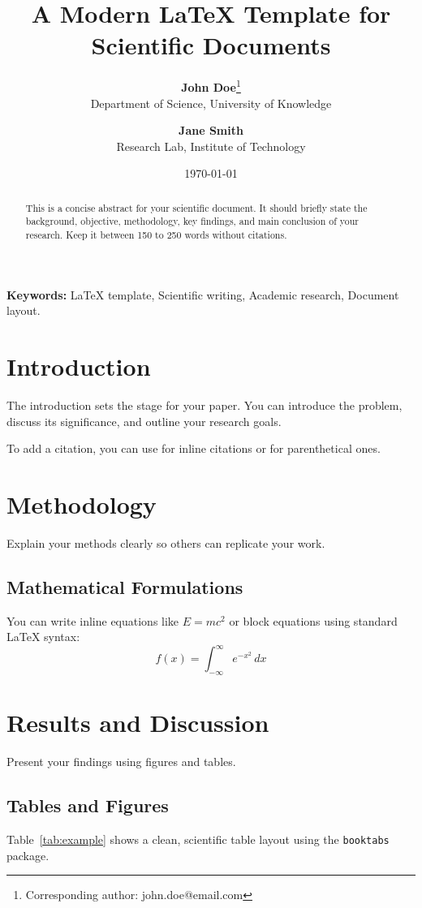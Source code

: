 \documentclass[11pt,a4paper]{article}
\title{\textbf{A Modern LaTeX Template for Scientific Documents}}
\author{
    \textbf{John Doe}\thanks{Corresponding author: john.doe@email.com} \\
    Department of Science, University of Knowledge \\
    \and
    \textbf{Jane Smith} \\
    Research Lab, Institute of Technology
}
\date{\today}
\begin{document}
\maketitle

\begin{abstract}
This is a concise abstract for your scientific document. It should briefly state the background, objective, methodology, key findings, and main conclusion of your research. Keep it between 150 to 250 words without citations.
\end{abstract}

\textbf{Keywords:} LaTeX template, Scientific writing, Academic research, Document layout.

\section{Introduction}
The introduction sets the stage for your paper. You can introduce the problem, discuss its significance, and outline your research goals. 

To add a citation, you can use \textcite{author2026} for inline citations or \parencite{author2026} for parenthetical ones.

\section{Methodology}
Explain your methods clearly so others can replicate your work. 

\subsection{Mathematical Formulations}
You can write inline equations like $E = mc^2$ or block equations using standard LaTeX syntax:
\begin{equation}
    f(x) = \int_{-\infty}^{\infty} e^{-x^2} \, dx
\end{equation}

\section{Results and Discussion}
Present your findings using figures and tables.

\subsection{Tables and Figures}
Table~\ref{tab:example} shows a clean, scientific table layout using the \texttt{booktabs} package.
\end{document}
